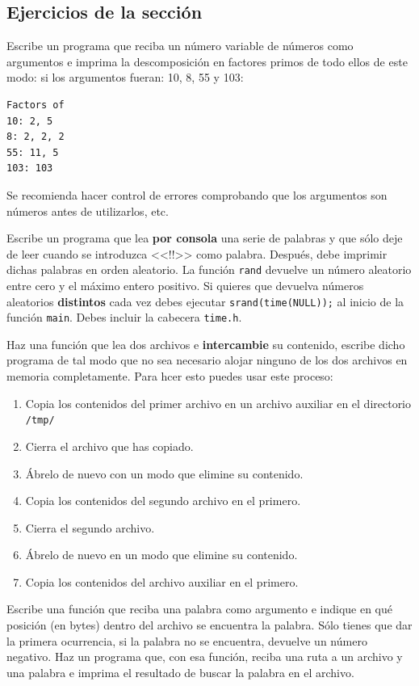 \documentclass[a4paper]{article}
\begin{document}
\subsection{Ejercicios de la sección}
\begin{exercises}[resume*]
\item Escribe un programa que reciba un número variable de números como
argumentos e imprima la descomposición en factores primos de todo ellos de este
modo: si los argumentos fueran: 10, 8, 55 y 103:

\noindent
\begin{minipage}[H]{\linewidth}
\mbox{}
\begin{verbatim}
Factors of
10: 2, 5
8: 2, 2, 2
55: 11, 5
103: 103
\end{verbatim}
\end{minipage}

Se recomienda hacer control de errores comprobando que los argumentos son
números antes de utilizarlos, etc.
\item Escribe un programa que lea \textbf{por consola} una serie de palabras
y que sólo deje de leer cuando se introduzca <<!!>> como palabra. Después, debe
imprimir dichas palabras en orden aleatorio. La función \verb!rand! devuelve
un número aleatorio entre cero y el máximo entero positivo. Si quieres que
devuelva números aleatorios \textbf{distintos} cada vez debes ejecutar
\verb!srand(time(NULL));! al inicio de la función \verb!main!. Debes incluir la
cabecera \verb!time.h!.

\item Haz una función que lea dos archivos e \textbf{intercambie} su contenido,
escribe dicho programa de tal modo que no sea necesario alojar ninguno de los
dos archivos en memoria completamente. Para hcer esto puedes usar este proceso:
\begin{enumerate}
\item Copia los contenidos del primer archivo
en un archivo auxiliar en el directorio \verb!/tmp/!
\item Cierra el archivo que has copiado.
\item Ábrelo de nuevo con un modo que elimine su contenido.
\item Copia los contenidos del segundo archivo en el primero.
\item Cierra el segundo archivo.
\item Ábrelo de nuevo en un modo que elimine su contenido.
\item Copia los contenidos del archivo auxiliar en el primero.
\end{enumerate}

\item Escribe una función que reciba una palabra como argumento e indique
en qué posición (en bytes) dentro del archivo se encuentra la palabra. Sólo
tienes que dar la primera ocurrencia, si la palabra no se encuentra, devuelve
un número negativo. Haz un programa que, con esa función, reciba una ruta a un
archivo y una palabra e imprima el resultado de buscar la palabra en el archivo.
\end{exercises}
\end{document}
